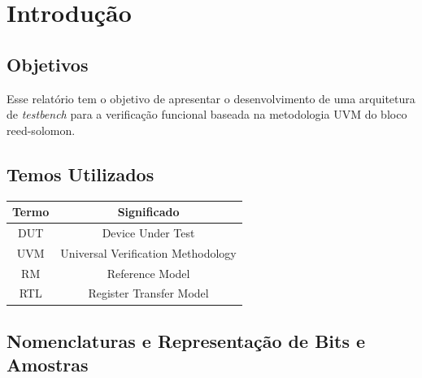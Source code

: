 \documentclass[a4paper]{article}
\begin{document}
\begin{versionhistory}
\end{versionhistory}

\newpage

\tableofcontents

\newpage

\section{Introdução}
\subsection{Objetivos}

\par
Esse relatório tem o objetivo de apresentar o desenvolvimento de uma arquitetura de \textit{testbench} para a verificação funcional baseada na metodologia UVM do bloco reed-solomon.

\subsection{Temos Utilizados}

\begin{table}[h]
\centering
\begin{tabular}{|c|c|}
\hline
\rowcolor[HTML]{27378F} 
{\color[HTML]{FFFFFF} Termo} & {\color[HTML]{FFFFFF} Significado} \\ \hline
DUT                          & Device Under Test                  \\ \hline
UVM                          & Universal Verification Methodology \\ \hline
RM                           & Reference Model                    \\ \hline
RTL                          & Register Transfer Model            \\ \hline
\end{tabular}
\end{table}


\subsection{Nomenclaturas e Representação de Bits e Amostras}
\end{document}
